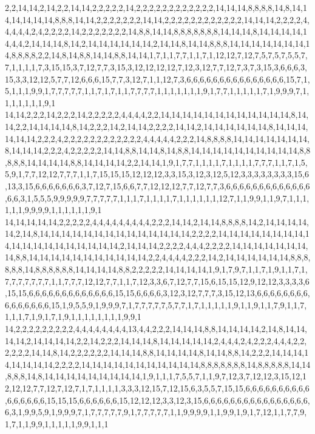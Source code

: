 2,2,14,14,2,14,2,2,14,14,2,2,2,2,2,14,2,2,2,2,2,2,2,2,2,2,2,2,14,14,14,8,8,8,8,14,8,14,14,14,14,14,14,8,8,8,14,14,2,2,2,2,2,2,2,14,14,2,2,2,2,2,2,2,2,2,2,2,2,14,14,14,2,2,2,2,4,4,4,4,4,2,4,2,2,2,2,14,2,2,2,2,2,2,2,14,8,8,14,14,8,8,8,8,8,8,8,14,14,14,8,14,14,14,14,14,4,4,2,14,14,14,8,14,2,14,14,14,14,14,14,2,14,14,8,14,14,8,8,8,14,14,14,14,14,14,14,14,8,8,8,8,2,2,14,8,14,8,8,14,14,8,8,14,14,1,7,1,1,7,7,1,1,7,1,12,12,7,12,7,5,7,5,7,5,5,7,7,1,1,1,1,7,3,15,15,3,7,12,7,7,3,15,3,12,12,12,12,7,12,3,12,7,7,12,7,3,7,3,15,3,6,6,6,3,15,3,3,12,12,5,7,7,12,6,6,6,15,7,7,3,12,7,1,1,12,7,3,6,6,6,6,6,6,6,6,6,6,6,6,6,6,6,15,7,1,5,1,1,1,9,9,1,7,7,7,7,7,1,1,7,1,7,1,1,7,7,7,7,1,1,1,1,1,1,1,9,1,7,7,1,1,1,1,1,7,1,9,9,9,7,1,1,1,1,1,1,1,9,1
14,14,2,2,2,14,2,2,2,14,2,2,2,2,2,4,4,4,4,2,2,14,14,14,14,14,14,14,14,14,14,14,14,8,14,14,2,2,14,14,14,14,8,14,2,2,2,14,2,14,14,2,2,2,2,14,14,2,14,14,14,14,14,14,8,14,14,14,14,14,14,2,2,2,4,2,2,2,2,2,2,2,2,2,2,2,2,4,4,4,4,4,2,2,2,14,8,8,8,8,14,14,14,14,14,14,14,8,14,14,14,2,2,2,4,2,2,2,2,2,14,14,8,8,14,14,8,14,8,8,14,14,14,14,14,14,14,14,14,14,8,8,8,8,8,14,14,14,14,8,8,14,14,14,14,2,2,14,14,1,9,1,7,7,1,1,1,1,7,1,1,1,1,7,7,7,1,1,7,1,5,5,9,1,7,7,12,12,7,7,7,1,1,7,15,15,15,12,12,12,3,3,15,3,12,3,12,5,12,3,3,3,3,3,3,3,3,15,6,13,3,15,6,6,6,6,6,6,6,3,7,12,7,15,6,6,7,7,12,12,12,7,7,12,7,7,3,6,6,6,6,6,6,6,6,6,6,6,6,6,6,6,3,1,5,5,5,9,9,9,9,9,7,7,7,7,7,1,1,1,7,1,1,1,1,7,1,1,1,1,1,1,12,7,1,1,9,9,1,1,9,7,1,1,1,1,1,1,9,9,9,9,1,1,1,1,1,1,9,1
14,14,14,14,14,2,2,2,2,2,4,4,4,4,4,4,4,4,4,2,2,2,14,14,2,14,14,8,8,8,8,14,2,14,14,14,14,14,2,14,8,14,14,14,14,14,14,14,14,14,14,14,14,14,14,2,2,2,2,14,14,14,14,14,14,14,14,14,14,14,14,14,14,14,14,14,14,14,2,14,14,14,2,2,2,2,4,4,4,2,2,2,2,14,14,14,14,14,14,14,14,8,8,14,14,14,14,14,14,14,14,14,14,14,2,2,4,4,4,4,2,2,2,14,2,14,14,14,14,14,14,8,8,8,8,8,8,14,8,8,8,8,8,8,14,14,14,14,8,8,2,2,2,2,2,14,14,14,14,1,9,1,7,9,7,1,1,7,1,9,1,1,7,1,7,7,7,7,7,7,7,1,1,7,7,7,12,12,7,7,1,1,7,12,3,3,6,7,12,7,7,15,6,15,15,12,9,12,12,3,3,3,3,6,15,15,6,6,6,6,6,6,6,6,6,6,6,6,6,15,15,6,6,6,6,3,12,3,12,7,7,7,3,15,12,13,6,6,6,6,6,6,6,6,6,6,6,6,6,6,6,15,1,9,5,5,9,1,9,9,9,7,1,7,7,7,7,7,5,7,7,1,7,1,1,1,1,1,9,1,1,9,1,1,7,9,1,1,7,1,1,1,7,1,9,1,7,1,9,1,1,1,1,1,1,1,1,9,9,1
14,2,2,2,2,2,2,2,2,2,4,4,4,4,4,4,4,4,13,4,4,2,2,2,14,14,14,8,8,14,14,14,14,2,14,8,14,14,14,14,2,14,14,14,14,2,2,14,2,2,2,14,14,14,8,14,14,14,14,14,2,4,4,4,2,4,2,2,2,4,4,4,2,2,2,2,2,2,14,14,8,14,2,2,2,2,2,2,14,14,14,8,8,14,14,14,14,8,14,14,8,8,14,2,2,2,14,14,14,14,14,14,14,14,2,2,2,2,14,14,14,14,14,14,14,14,14,14,14,8,8,8,8,8,8,8,14,8,8,8,8,8,14,14,8,8,8,14,8,14,14,14,14,14,14,14,14,14,1,9,1,1,1,7,5,5,7,1,1,9,7,12,3,7,12,12,3,15,12,12,12,12,7,7,12,7,12,7,1,7,1,1,1,1,3,3,3,12,15,7,12,15,6,3,5,5,7,15,15,6,6,6,6,6,6,6,6,6,6,6,6,6,6,6,6,15,15,15,6,6,6,6,6,6,15,12,12,12,3,3,12,3,15,6,6,6,6,6,6,6,6,6,6,6,6,6,6,6,6,6,3,1,9,9,5,9,1,9,9,9,7,1,7,7,7,7,7,9,1,7,7,7,7,7,1,1,9,9,9,9,1,1,9,9,1,9,1,7,12,1,1,7,7,9,1,7,1,1,9,9,1,1,1,1,1,9,9,1,1,1
